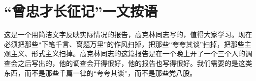 \section[ “曾忠才长征记”一文按语（一九四一年八月二十六日）]{ “曾忠才长征记”一文按语}


这是一个用简洁文字反映实际情况的报告，高克林同志写的，值得大家学习。现在必须把那些“下笔千言、离题万里”的作风扫掉，把那些“夸夸其谈”扫掉，把那些主观主义、形式主义扫掉。高克林同志的这篇报告是在一个晚上开了一个三个人的调查会之后写出的，他的调查会开得很好，他的报告也写得很好。我们需要的是这类东西，而不是那些千篇一律的“夸夸其谈”，而不是那些党八股。


